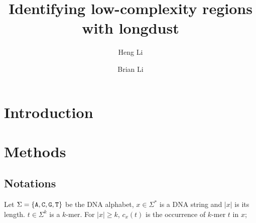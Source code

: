 \documentclass[webpdf,contemporary,large,namedate]{oup-authoring-template}%
\begin{document}

\title[Finding low-complexity regions]{Identifying low-complexity regions with longdust}
\author[1,2,3,$\ast$]{Heng Li}
\author[4]{Brian Li}
\address[1]{Department of Biomedical Informatics, Harvard Medical School, 10 Shattuck St, Boston, MA 02215, USA}
\address[2]{Department of Data Science, Dana-Farber Cancer Institute, 450 Brookline Ave, Boston, MA 02215, USA}
\address[3]{Broad Insitute of MIT and Harvard, 415 Main St, Cambridge, MA 02142, USA}
\address[4]{Commonwealth School, Boston, MA 02116, USA}



\maketitle

\section{Introduction}

\section{Methods}

\subsection{Notations}

Let $\Sigma=\{{\tt A},{\tt C},{\tt G},{\tt T}\}$ be the DNA alphabet,
$x\in\Sigma^*$ is a DNA string and $|x|$ is its length.
$t\in\Sigma^k$ is a $k$-mer.
For $|x|\ge k$, $c_x(t)$ is the occurrence of $k$-mer $t$ in $x$;
\end{document}
